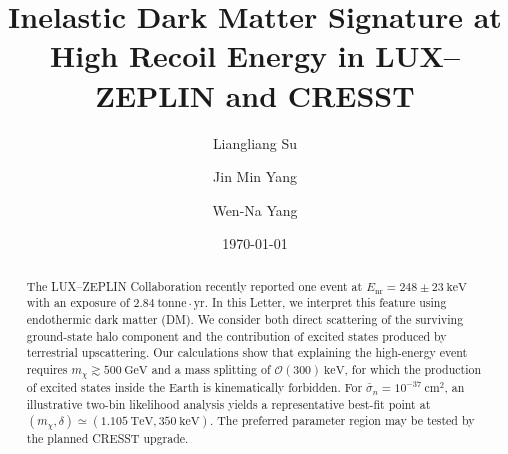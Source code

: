 \documentclass[aps,twocolumn,prl,showpacs,showkeys,preprintnumbers,superscriptaddress,nobibnotes,floatfix,nofootinbib]{revtex4-2}
\begin{document}
\title{Inelastic Dark Matter Signature at High Recoil Energy in LUX--ZEPLIN and CRESST}%




\author{Liangliang Su}


\author{Jin Min Yang}

\author{Wen-Na Yang}






\date{\today}%

\begin{abstract}
The LUX--ZEPLIN Collaboration recently reported one event at $E_{\mathrm{nr}}=248\pm23~\mathrm{keV}$ with an exposure of $2.84~\mathrm{tonne\cdot yr}$. In this Letter, we interpret this feature using endothermic dark matter (DM). We consider both direct scattering of the surviving ground-state halo component and the contribution of excited states produced by terrestrial upscattering. Our calculations show that explaining the high-energy event requires $m_\chi\gtrsim500~\mathrm{GeV}$ and a mass splitting of $\mathcal{O}(300)~\mathrm{keV}$, for which the production of excited states inside the Earth is kinematically forbidden. For $\bar{\sigma}_n=10^{-37}~\mathrm{cm^2}$, an illustrative two-bin likelihood analysis yields a representative best-fit point at $(m_\chi,\delta)\simeq(1.105~\mathrm{TeV},350~\mathrm{keV})$. The preferred parameter region may be tested by the planned CRESST upgrade.

\end{abstract}

\maketitle
\end{document}
